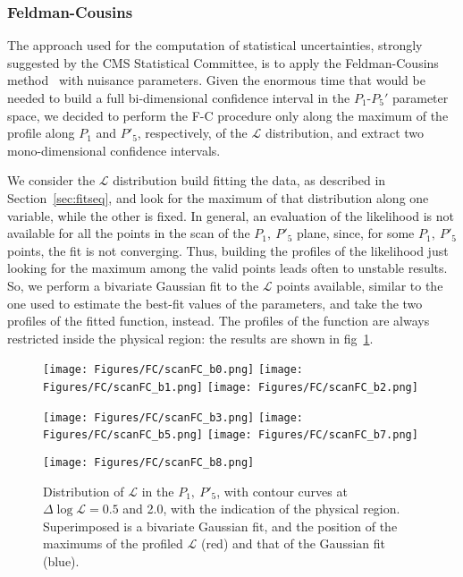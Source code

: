 

\subsubsection{Feldman-Cousins}
The approach used for the computation of statistical uncertainties, strongly suggested by the CMS Statistical Committee, is to apply the Feldman-Cousins method~\cite{FC} with nuisance parameters.
Given the enormous time that would be needed to build a full bi-dimensional confidence interval in the $P_1$-$P_5'$ parameter space, we decided to perform the F-C procedure only along the maximum of the profile along $P_1$ and $P'_5$, respectively, of the $\mathcal{L}$ distribution, and extract two mono-dimensional confidence intervals.

We consider the $\mathcal{L}$ distribution build fitting the data, as described in Section~\ref{sec:fitseq}, and look for the maximum of that distribution along one variable, while the other is fixed.
In general, an evaluation of the likelihood is not available for all the points in the scan of the $P_1,~P'_5$ plane, since, for some $P_1,~P'_5$ points, the fit is not converging.
Thus, building the profiles of the likelihood just looking for the maximum among the valid points leads often to unstable results.
So, we perform a bivariate Gaussian fit to the $\mathcal{L}$ points available, similar to the one used to estimate the best-fit values of the parameters, and take the two profiles of the fitted function, instead.
The profiles of the function are always restricted inside the physical region: the results are shown in fig~\ref{fig:profileL}.

\begin{figure}
  \centering
  \texttt{[image: Figures/FC/scanFC\_b0.png]}
  \texttt{[image: Figures/FC/scanFC\_b1.png]}
  \texttt{[image: Figures/FC/scanFC\_b2.png]}

  \texttt{[image: Figures/FC/scanFC\_b3.png]}
  \texttt{[image: Figures/FC/scanFC\_b5.png]}
  \texttt{[image: Figures/FC/scanFC\_b7.png]}

  \texttt{[image: Figures/FC/scanFC\_b8.png]}
  \caption{Distribution of $\mathcal{L}$ in the $P_1,~P'_5$, with contour curves at $\Delta\log{\mathcal{L}}=0.5$ and 2.0, with the indication of the physical region.
    Superimposed is a bivariate Gaussian fit, and the position of the maximums of the profiled $\mathcal{L}$ (red) and that of the Gaussian fit (blue).}
  \label{fig:profileL}
\end{figure}

